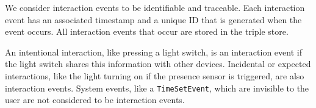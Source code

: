 
We consider interaction events to be identifiable and traceable. Each interaction event has an associated timestamp and a unique ID that is generated when the event occurs. All interaction events that occur are stored in the triple store.

An intentional interaction, like pressing a light switch, is an interaction event if the light switch shares this information with other devices. Incidental or expected interactions, like the light turning on if the presence sensor is triggered, are also interaction events. System events, like a \texttt{TimeSetEvent}, which are invisible to the user are not considered to be interaction events.

